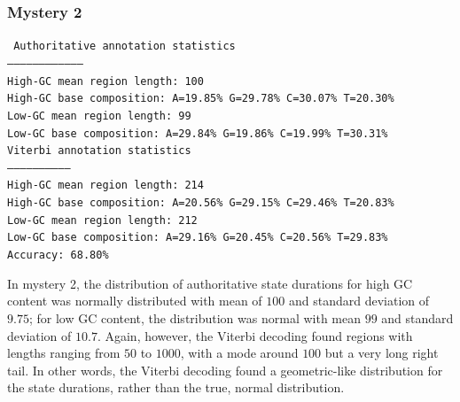 \documentclass[a4paper]{article}
\begin{document}
\subsubsection*{Mystery 2}
{\tt
Authoritative annotation statistics\\
-----------------------------------\\
High-GC mean region length:  100\\
High-GC base composition: A=19.85\% G=29.78\% C=30.07\% T=20.30\%\\
Low-GC mean region length:  99\\
Low-GC base composition: A=29.84\% G=19.86\% C=19.99\% T=30.31\%\\

\noindent Viterbi annotation statistics\\
-----------------------------\\
High-GC mean region length:  214\\
High-GC base composition: A=20.56\% G=29.15\% C=29.46\% T=20.83\%\\
Low-GC mean region length:  212\\
Low-GC base composition: A=29.16\% G=20.45\% C=20.56\% T=29.83\%\\

\noindent Accuracy: 68.80\%\\
}

In mystery 2, the distribution of authoritative state
durations for high GC content was normally distributed with 
mean of $100$ and standard deviation of $9.75$; for low GC content,
the distribution was normal with mean $99$ and standard deviation
of $10.7$. Again, however, the Viterbi decoding found regions
with lengths ranging from $50$ to $1000$, with a mode around $100$
but a very long right tail. In other words, the Viterbi decoding
found a geometric-like distribution for the state durations, rather
than the true, normal distribution.
\end{document}
